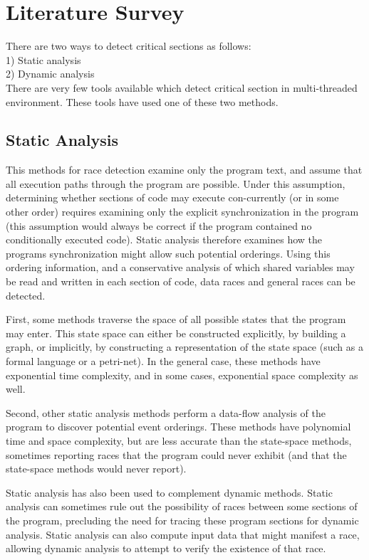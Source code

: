 \chapter{Literature Survey}

There are two ways to detect critical sections as follows:\\
1) Static analysis\\
2) Dynamic analysis\\

There are very few tools available which detect critical section in multi-threaded environment.
These tools have used one of these two methods.

\section{Static Analysis}
This methods for race detection examine only the program text, and assume that all execution paths through the program are possible. Under this assumption, determining whether sections of code may execute con-currently (or in some other order) requires examining only the explicit synchronization in the program (this assumption would always be correct if the program contained no conditionally executed code). Static analysis therefore examines how the programs synchronization might allow such potential orderings. Using this ordering information, and a conservative analysis of which shared variables may be read and written in each section of code, data races and general races can be detected.

First, some methods traverse the space of all possible states that the program may enter. This state space can either be constructed explicitly, by building a graph, or implicitly, by constructing a representation of the state space (such as a formal language or a petri-net). In the general case, these methods have exponential time complexity, and in some cases, exponential space complexity as well.

Second, other static analysis methods perform a data-flow analysis of the program to discover potential event orderings. These methods have polynomial time and space complexity, but are less accurate than the state-space methods, sometimes reporting races that the program could never exhibit (and that the state-space methods would never report).

Static analysis has also been used to complement dynamic methods. Static analysis can sometimes rule out the possibility of races between some sections of the program, precluding the need for tracing these program sections for dynamic analysis. Static analysis can also compute input data that might manifest a race, allowing dynamic analysis to attempt to verify the existence of that race.

